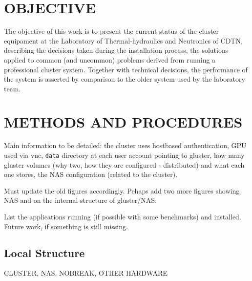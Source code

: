 \documentclass[twoside,a4paper,12pt,english]{inac17}
\begin{document}

\section{OBJECTIVE}

The objective of this work is to present the current status of the cluster equipament 
at the Laboratory of Thermal-hydraulics and Neutronics of CDTN, describing the decisions 
taken during the installation process, the solutions applied to common (and uncommon) problems 
derived from running a professional cluster system. Together with technical decisions, the 
performance of the system is asserted by comparison to the older system used by the laboratory 
team. 

\section{METHODS AND PROCEDURES}

Main information to be detailed: the cluster uses hostbased authentication, GPU used via 
vnc, \texttt{data} directory at each user account pointing to gluster, how many gluster 
volumes (why two, how they are configured - distributed) and what each one stores, 
the NAS configuration (related to the cluster).

Must update the old figures accordingly. Pehaps add two more figures showing NAS 
and on the internal structure of gluster/NAS.

List the applications running (if possible with some benchmarks) and installed. 
Future work, if something is still missing.

\subsection{Local Structure}
CLUSTER, NAS, NOBREAK, OTHER HARDWARE
\end{document}
